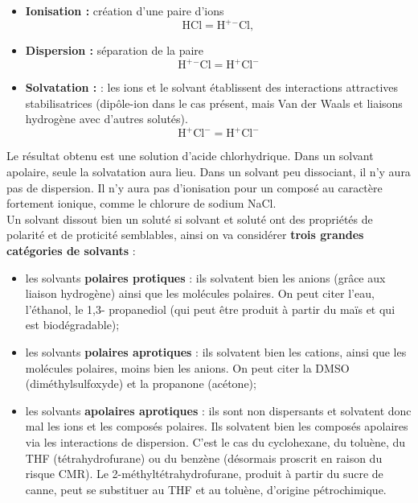 \documentclass[11pt,a4paper]{report}
\begin{document}
\begin{itemize}
	\item \textbf{Ionisation :} création d'une paire d'ions
	\begin{equation}
		\text{HCl} = \text{H}^+ {}^-\text{Cl},
	\end{equation}
	\item \textbf{Dispersion :} séparation de la paire
	\begin{equation}
		\text{H}^+ {}^-\text{Cl} = \text{H}^+ \text{Cl}^-
	\end{equation}		
	\item \textbf{Solvatation :} : les ions et le solvant établissent des interactions attractives 			stabilisatrices (dipôle-ion dans le cas présent, mais Van der Waals et liaisons hydrogène avec 			d'autres solutés).
	\begin{equation}
		\text{H}^+ \text{Cl}^- = \text{H}^+ \text{Cl}^-
	\end{equation}	 
\end{itemize}

Le résultat obtenu est une solution d'acide chlorhydrique. Dans un solvant apolaire, seule la solvatation aura lieu. Dans un solvant peu dissociant, il n'y aura pas de dispersion. Il n'y aura pas d'ionisation pour un composé au caractère fortement ionique, comme le chlorure de sodium NaCl.\\

Un solvant dissout bien un soluté si solvant et soluté ont des propriétés de polarité et de proticité semblables, ainsi on va considérer \textbf{trois grandes catégories de solvants} :
\begin{itemize}
	\item les solvants \textbf{polaires protiques} : ils solvatent bien les anions (grâce aux 				liaison hydrogène) ainsi que les molécules polaires. On peut citer l'eau, l'éthanol, le 1,3-			propanediol (qui peut être produit à partir du maïs et qui est biodégradable);\\
	\item les solvants \textbf{polaires aprotiques} : ils solvatent bien les cations, ainsi que les 		molécules polaires, moins bien les anions. On peut citer la DMSO (diméthylsulfoxyde) et la 				propanone (acétone);\\
	\item les solvants \textbf{apolaires aprotiques} : ils sont non dispersants et solvatent donc 			mal les ions et les composés polaires. Ils solvatent bien les composés apolaires via les 				interactions de dispersion. C'est le cas du cyclohexane, du toluène, du THF (tétrahydrofurane) 			ou du benzène (désormais proscrit en raison du risque CMR). Le 2-méthyltétrahydrofurane, produit 	à partir du sucre de canne, peut se substituer au THF et au toluène, d'origine pétrochimique.\\
\end{itemize}
\end{document}
